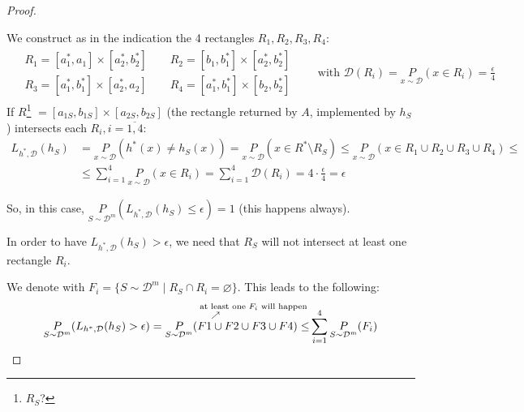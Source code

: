 \documentclass{article}
\newcommand{\<}{\langle}
\renewcommand{\>}{\rangle}
\renewcommand{\emptyset}{\varnothing}
\theoremstyle{definition}
\def\gD{{\mathcal{D}}}
\newcommand{\uset}{\underset}
\newcommand{\psdm}{\uset{S \sim \gD^m}{P}}
\newcommand{\hs}{h_S}
\newcommand{\hsx}{h_S(x)}
\newcommand{\uset}{\underset}
\newcommand{\psdm}{\uset{S \sim \gD^m}{P}}
\newcommand{\hs}{h_S}
\newcommand{\hsx}{h_S(x)}
\begin{document}
\begin{proof}
\begin{enumerate}[itemindent=0.5cm,label=Case \arabic*)]
\begin{figure}[h]
    \end{figure}
\end{enumerate}
We construct as in the indication the 4 rectangles $R_1, R_2, R_3, R_4$:
\begin{align*}
  &\begin{array}{l}
    R_1 = [a_1^*, a_1] \times [a_2^*, b_2^*] \qquad
    R_2 = [b_1, b_1^*] \times [a_2^*, b_2^*] \\
    R_3 = [a_1^*, b_1^*] \times [a_2^*, a_2] \qquad
    R_4 = [a_1^*, b_1^*] \times [b_2, b_2^*] 
  \end{array}
  \qquad
  \text{with } \gD(R_i) = \uset{x \sim \gD}{P}(x \in R_i) = \frac{\epsilon}{4}
\end{align*}
If $R$\footnote{$R_S$?} $= [a_{1S}, b_{1S}] \times [a_{2S}, b_{2S}]$
(the rectangle returned by $A$, implemented by $\hs$)
intersects each $R_i, i=\overline{1, 4}$:
\begin{align*}
  L_{h^*, \gD}(\hs) &=
    \uset{x \sim \gD}{P}(h^*(x) \neq \hsx) =
    \uset{x \sim \gD}{P}(x \in R^* \setminus R_S) \leq
    \uset{x \sim \gD}{P}(x \in R_1 \cup R_2 \cup R_3 \cup R_4) \leq \\
   &\leq \sum_{i=1}^4 \uset{x \sim \gD}{P}(x \in R_i)
       = \sum_{i=1}^4 \gD(R_i) = 4 \cdot \frac{\epsilon}{4} = \epsilon
\end{align*}

So, in this case,
$\psdm(L_{h^*, \gD}(\hs) \leq \epsilon) = 1$ (this happens always).

In order to have $L_{h^*, \gD}(\hs) > \epsilon$, we need that $R_S$ will not intersect
at least one rectangle $R_i$.

We denote with $F_i = \{S \sim \gD^m \mid R_S \cap R_i = \emptyset\}$.
This leads to the following:
\begin{align*}
  \psdm(L_{h^*, \gD}(\hs) > \epsilon) = 
  \psdm(\overbracket[0pt][0pt]{
    F1 \cup F2 \cup F3 \cup F4)
  \leq}^{
      \substack{\text{at least one } F_i \text{ will happen} \\ \quad\nearrow\hfill\phantom{.}
      }} \sum_{i=1}^4 \psdm(F_i)
\end{align*}


\end{proof}
\end{document}
